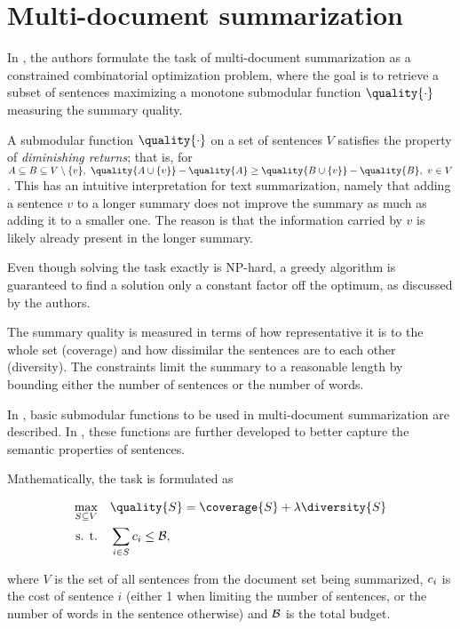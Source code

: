 \section{Multi-document summarization}
In \cite{multi-summarization-1}, the authors formulate the task of multi-document summarization as a constrained combinatorial optimization problem, where the goal is to retrieve a subset of sentences maximizing a monotone submodular function $\quality{\cdot}$ measuring the summary quality.

A submodular function $\quality{\cdot}$ on a set of sentences $V$ satisfies the property of \textit{diminishing returns}; that is, for $A \subseteq B \subseteq V \setminus \{ v \},\ \quality{A \cup \{ v \}} - \quality{A} \geq \quality{B \cup \{ v \}} - \quality{B},\ v \in V$. This has an intuitive interpretation for text summarization, namely that adding a sentence $v$ to a longer summary does not improve the summary as much as adding it to a smaller one. The reason is that the information carried by $v$ is likely already present in the longer summary.

Even though solving the task exactly is NP-hard, a greedy algorithm is guaranteed to find a solution only a constant factor off the optimum, as discussed by the authors.

The summary quality is measured in terms of how representative it is to the whole set (coverage) and how dissimilar the sentences are to each other (diversity). The constraints limit the summary to a reasonable length by bounding either the number of sentences or the number of words.

In \cite{multi-summarization-1}, basic submodular functions to be used in multi-document summarization are described. In \cite{multi-summarization-2}, these functions are further developed to better capture the semantic properties of sentences.

Mathematically, the task is formulated as

\begin{equation}
\begin{alignedat}{-1}
\max_{S \subseteq V} & \quad \quality{S} = \coverage{S} + \lambda \diversity{S} \\
\text{s. t.} & \quad \sum_{i \in S}{\sentcost_{i}} \leq \budget,
\end{alignedat}
\end{equation}

where $V$ is the set of all sentences from the document set being summarized, $c_{i}$ is the cost of sentence $i$ (either 1 when limiting the number of sentences, or the number of words in the sentence otherwise) and $\mathcal{B}$ is the total budget.

